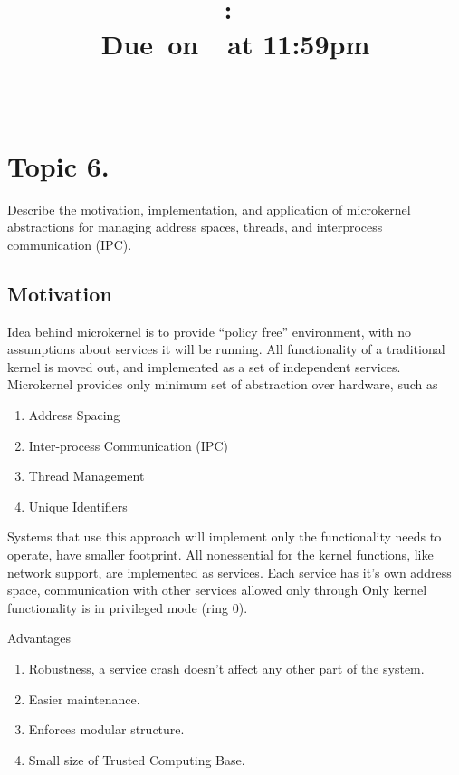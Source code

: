 \documentclass{article}
\title{
    \vspace{2in}
    \textmd{\textbf{\hmwkClass:\ \hmwkTitle}}\\
        \normalsize\vspace{0.1in}\small{Due\ on\ \hmwkDueDate\ at 11:59pm}\\
        \vspace{0.1in}\large{\textit{\hmwkClassInstructor\ \hmwkClassTime}}
    \vspace{3in}
}
\author{\textbf{\hmwkAuthorName}}
\date{}
\begin{document}
\maketitle

\pagebreak

        \section{Topic 6.}  Describe the motivation, implementation, and application of microkernel
        abstractions for managing address spaces, threads, and interprocess communication (IPC). \\

             \subsection{Motivation}
             Idea behind microkernel is to provide ``policy free'' environment, with no assumptions about
             services it will be running. All functionality of a traditional kernel is moved out, and
             implemented as a set of independent services. Microkernel provides only minimum set of
             abstraction over hardware, such as
             \begin{enumerate}[-, leftmargin = 0.7cm, nosep]
                 \item Address Spacing
                 \item Inter-process Communication (IPC)
                 \item Thread Management
                 \item Unique Identifiers
             \end{enumerate}
        Systems that use this approach will implement only the functionality needs to operate, have
        smaller footprint. All nonessential for the kernel functions, like network support, are
        implemented as services. Each service has it's own address space, communication with other
        services allowed only through Only kernel functionality is in privileged mode (ring 0). 
        \vspace{0.2cm}

        Advantages
        \begin{enumerate}[-, leftmargin = 0.7cm, nosep]
            \item Robustness, a service crash doesn't affect any other part of the system.
            \item Easier maintenance.
            \item Enforces modular structure.
            \item Small size of Trusted Computing Base.
        \end{enumerate}
        \vspace{0.2cm}
\end{document}
